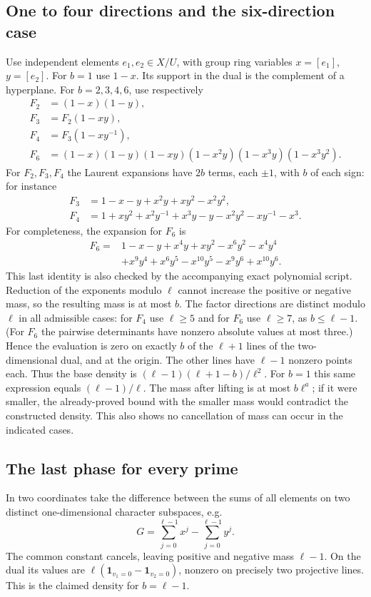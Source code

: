 \documentclass[11pt]{article}
\theoremstyle{remark}\newtheorem{remark}[theorem]{Remark}
\newcommand{\one}{\mathbf 1}
\begin{document}
\subsection{One to four directions and the six-direction case}
Use independent elements $e_1,e_2\in X/U$, with group ring variables $x=[e_1]$, $y=[e_2]$. For $b=1$ use $1-x$. Its support in the dual is the complement of a hyperplane. For $b=2,3,4,6$, use respectively
\begin{align*}
F_2&=(1-x)(1-y),\\
F_3&=F_2(1-xy),\\
F_4&=F_3(1-xy^{-1}),\\
F_6&=(1-x)(1-y)(1-xy)(1-x^2y)(1-x^3y)(1-x^3y^2).
\end{align*}
For $F_2,F_3,F_4$ the Laurent expansions have $2b$ terms, each $\pm1$, with $b$ of each sign: for instance
\begin{align*}
F_3&=1-x-y+x^2y+xy^2-x^2y^2,\\
F_4&=1+xy^2+x^2y^{-1}+x^3y-y-x^2y^2-xy^{-1}-x^3.
\end{align*}
For completeness, the expansion for $F_6$ is
\begin{align*}
F_6={}&1-x-y+x^4y+x y^2-x^6y^2-x^4y^4\\
 &+x^9y^4+x^6y^5-x^{10}y^5-x^9y^6+x^{10}y^6.
\end{align*}
This last identity is also checked by the accompanying exact polynomial script. Reduction of the exponents modulo $\ell$ cannot increase the positive or negative mass, so the resulting mass is at most $b$. The factor directions are distinct modulo $\ell$ in all admissible cases: for $F_4$ use $\ell\ge5$ and for $F_6$ use $\ell\ge7$, as $b\le\ell-1$. (For $F_6$ the pairwise determinants have nonzero absolute values at most three.) Hence the evaluation is zero on exactly $b$ of the $\ell+1$ lines of the two-dimensional dual, and at the origin. The other lines have $\ell-1$ nonzero points each. Thus the base density is $(\ell-1)(\ell+1-b)/\ell^2$. For $b=1$ this same expression equals $(\ell-1)/\ell$. The mass after lifting is at most $b\ell^a$; if it were smaller, the already-proved bound with the smaller mass would contradict the constructed density. This also shows no cancellation of mass can occur in the indicated cases.

\subsection{The last phase for every prime}
In two coordinates take the difference between the sums of all elements on two distinct one-dimensional character subspaces, e.g.
\[
G=\sum_{j=0}^{\ell-1}x^j-\sum_{j=0}^{\ell-1}y^j.
\]
The common constant cancels, leaving positive and negative mass $\ell-1$. On the dual its values are $\ell(\one_{v_1=0}-\one_{v_2=0})$, nonzero on precisely two projective lines. This is the claimed density for $b=\ell-1$.
\end{document}
